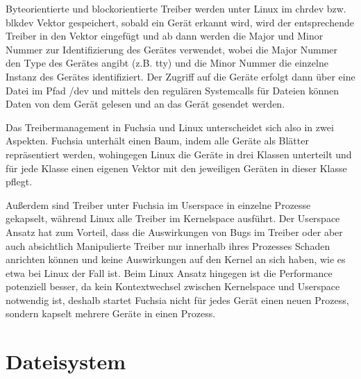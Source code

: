 \documentclass[a4paper]{scrartcl}
\begin{document}
Byteorientierte und blockorientierte Treiber werden unter Linux im chrdev bzw. blkdev Vektor gespeichert, sobald ein Gerät erkannt wird, wird der entsprechende Treiber in den Vektor eingefügt und ab dann werden die Major und Minor Nummer zur Identifizierung des Gerätes verwendet, wobei die Major Nummer den Type des Gerätes angibt (z.B. tty) und die Minor Nummer die einzelne Instanz des Gerätes identifiziert. Der Zugriff auf die Geräte erfolgt dann über eine Datei im Pfad /dev und mittels den regulären Systemcalls für Dateien können Daten von dem Gerät gelesen und an das Gerät gesendet werden.

Das Treibermanagement in Fuchsia und Linux unterscheidet sich also in zwei Aspekten. Fuchsia unterhält einen Baum, indem alle Geräte als Blätter repräsentiert werden, wohingegen Linux die Geräte in drei Klassen unterteilt und für jede Klasse einen eigenen Vektor mit den jeweiligen Geräten in dieser Klasse pflegt.

Außerdem sind Treiber unter Fuchsia im Userspace in einzelne Prozesse gekapselt, während Linux alle Treiber im Kernelspace ausführt. Der Userspace Ansatz hat zum Vorteil, dass die Auswirkungen von Bugs im Treiber oder aber auch absichtlich Manipulierte Treiber nur innerhalb ihres Prozesses Schaden anrichten können und keine Auswirkungen auf den Kernel an sich haben, wie es etwa bei Linux der Fall ist. Beim Linux Ansatz hingegen ist die Performance potenziell  besser, da kein Kontextwechsel zwischen Kernelspace und Userspace notwendig ist, deshalb startet Fuchsia nicht für jedes Gerät einen neuen Prozess, sondern kapselt mehrere Geräte in einen Prozess.

\section{Dateisystem}
\label{sec:Dateisystem}
\end{document}
